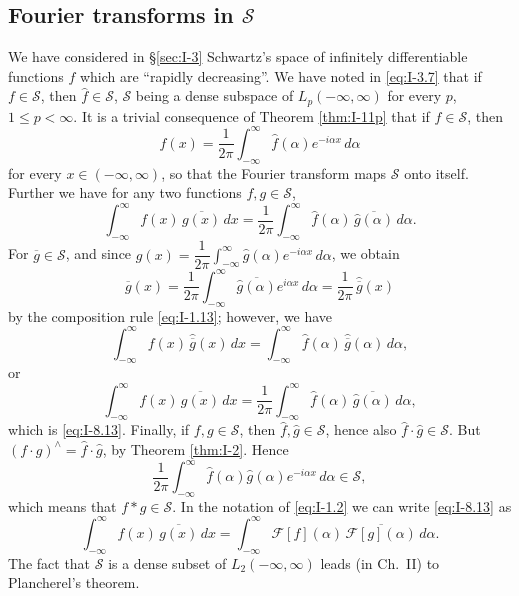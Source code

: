 \subsection*{Fourier transforms in $\mathcal S$}
We have considered in \S\ref{sec:I-3} Schwartz's space of infinitely differentiable functions $f$ which are ``rapidly decreasing''. We have noted in \eqref{eq:I-3.7} that if $f\in\mathcal S$, then $\widehat f\in\mathcal S$, $\mathcal S$ being a dense subspace of $L_p(-\infty,\infty)$ for every $p$, $1\le p<\infty$. It is a trivial consequence of Theorem \ref{thm:I-11p} that if $f\in\mathcal S$, then
\begin{equation}\label{eq:I-8.12}\tag{8.12}
f(x)=\frac{1}{2\pi}\int_{-\infty}^{\infty}\widehat f(\alpha)e^{-i\alpha x}\,d\alpha
\end{equation}
for every $x\in(-\infty,\infty)$, so that the Fourier transform maps $\mathcal S$ onto itself. Further we have for any two functions $f,g\in\mathcal S$,
\begin{equation}\label{eq:I-8.13}\tag{8.13}
\int_{-\infty}^{\infty}f(x)\,\overline{g(x)}\,dx
=\frac{1}{2\pi}\int_{-\infty}^{\infty}\widehat f(\alpha)\,\overline{\widehat g(\alpha)}\,d\alpha.
\end{equation}
For $\overline g\in\mathcal S$, and since $g(x)=\dfrac{1}{2\pi}\int_{-\infty}^{\infty}\widehat g(\alpha)e^{-i\alpha x}\,d\alpha$, we obtain
\begin{equation*}
\overline{g}(x)=\frac{1}{2\pi}\int_{-\infty}^{\infty}\overline{\widehat g(\alpha)}e^{i\alpha x}\,d\alpha
=\frac{1}{2\pi}\,\widehat{\overline g}(x)
\end{equation*}
by the composition rule \eqref{eq:I-1.13}; however, we have
\begin{equation*}
\int_{-\infty}^{\infty}f(x)\,\widehat{\overline g}(x)\,dx
=\int_{-\infty}^{\infty}\widehat f(\alpha)\,\widehat{\overline g}(\alpha)\,d\alpha,
\end{equation*}
or
\begin{equation*}
\int_{-\infty}^{\infty}f(x)\,\overline{g(x)}\,dx
=\frac{1}{2\pi}\int_{-\infty}^{\infty}\widehat f(\alpha)\,\overline{\widehat g(\alpha)}\,d\alpha,
\end{equation*}
which is \eqref{eq:I-8.13}. Finally, if $f,g\in\mathcal S$, then $\widehat f,\widehat g\in\mathcal S$, hence also $\widehat f\cdot\widehat g\in\mathcal S$. But $(f\cdot g)^{\wedge}=\widehat f\cdot\widehat g$, by Theorem \ref{thm:I-2}. Hence
\begin{equation}\label{eq:I-8.14}\tag{8.14}
\frac{1}{2\pi}\int_{-\infty}^{\infty}\widehat f(\alpha)\widehat g(\alpha)e^{-i\alpha x}\,d\alpha\in\mathcal S,
\end{equation}
which means that $f*g\in\mathcal S$. In the notation of \eqref{eq:I-1.2} we can write \eqref{eq:I-8.13} as
\begin{equation}\label{eq:I-8.15}\tag{8.15}
\int_{-\infty}^{\infty}f(x)\,\overline{g(x)}\,dx
=\int_{-\infty}^{\infty}\mathcal F[f](\alpha)\,\overline{\mathcal F[g](\alpha)}\,d\alpha.
\end{equation}
The fact that $\mathcal S$ is a dense subset of $L_2(-\infty,\infty)$ leads (in Ch.~II) to Plancherel's theorem.

